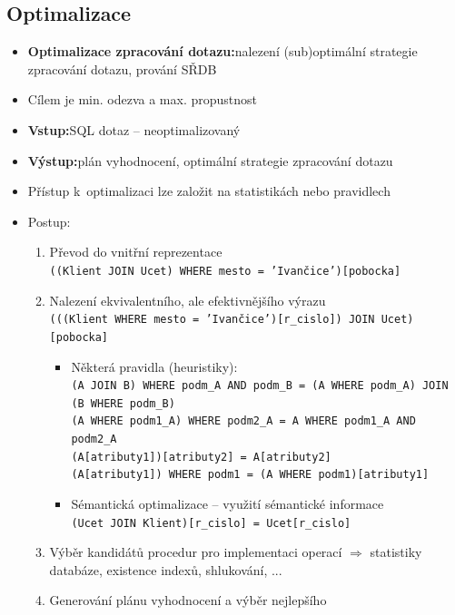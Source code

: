 \documentclass[a4paper,10pt]{article}
\newcommand{\pojem}[2]{\item \textbf{#1:}\quad #2}
\newcommand{\tedy}{$\Rightarrow$ }
\begin{document}
		\subsection{Optimalizace}
			\begin{itemize}
				\pojem{Optimalizace zpracování dotazu}{nalezení (sub)optimální strategie zpracování dotazu, prování SŘDB}
				\item Cílem je min. odezva a max. propustnost
				\pojem{Vstup}{SQL dotaz -- neoptimalizovaný}
				\pojem{Výstup}{plán vyhodnocení, optimální strategie zpracování dotazu}
				\item Přístup k~optimalizaci lze založit na statistikách nebo pravidlech
				\item Postup:
				\begin{enumerate}
					\item Převod do vnitřní reprezentace \\
					\texttt{((Klient JOIN Ucet) WHERE mesto = 'Ivančice')[pobocka]}
					\item Nalezení ekvivalentního, ale efektivnějšího výrazu \\
					\texttt{(((Klient WHERE mesto = 'Ivančice')[r\_cislo]) JOIN Ucet)[pobocka]}
					\begin{itemize}
						\item Některá pravidla (heuristiky): \\
						\texttt{(A JOIN B) WHERE podm\_A AND podm\_B = (A WHERE podm\_A) JOIN (B WHERE podm\_B)} \\
						\texttt{(A WHERE podm1\_A) WHERE podm2\_A = A WHERE podm1\_A AND podm2\_A} \\
						\texttt{(A[atributy1])[atributy2] = A[atributy2]} \\
						\texttt{(A[atributy1]) WHERE podm1 = (A WHERE podm1)[atributy1]}
						\item Sémantická optimalizace -- využití sémantické informace \\
						\texttt{(Ucet JOIN Klient)[r\_cislo] = Ucet[r\_cislo]}
					\end{itemize}
					\item Výběr kandidátů procedur pro implementaci operací \tedy statistiky databáze, existence indexů, shlukování, ... 
					\item Generování plánu vyhodnocení a výběr nejlepšího
				\end{enumerate}
			\end{itemize}
			
\end{document}
